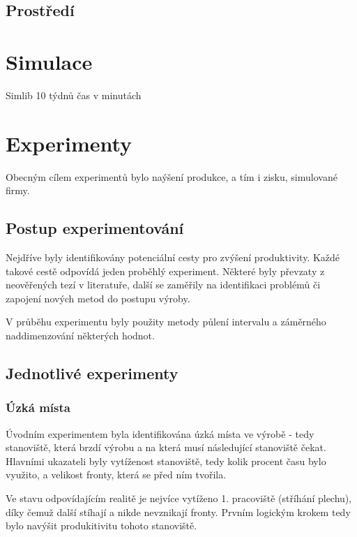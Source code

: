 \documentclass[11pt, a4paper]{article}
\begin{document}
\subsection{Prostředí}

\section{Simulace}
Simlib
10 týdnů
čas v minutách

\section{Experimenty}
Obecným cílem experimentů bylo naýšení produkce, a tím i zisku, simulované firmy.

\subsection{Postup experimentování}
Nejdříve byly identifikovány potenciální cesty pro zvýšení produktivity. Každé takové cestě odpovídá jeden proběhlý experiment. Některé byly převzaty z neověřených tezí v literatuře, další se zaměřily na identifikaci problémů či zapojení nových metod do postupu výroby.

V průběhu experimentu byly použity metody půlení intervalu a záměrného naddimenzování některých hodnot.

\subsection{Jednotlivé experimenty}


\subsubsection{Úzká místa}
Úvodním experimentem byla identifikována úzká místa ve výrobě - tedy stanoviště, která brzdí výrobu a na která musí následující stanoviště čekat. Hlavními ukazateli byly vytíženost stanoviště, tedy kolik procent času bylo využito, a velikost fronty, která se před ním tvořila.

Ve stavu odpovídajícím realitě je nejvíce vytíženo 1. pracoviště (stříhání plechu), díky čemuž další stíhají a nikde nevznikají fronty. Prvním logickým krokem tedy bylo navýšit produkitivitu tohoto stanoviště.
\end{document}
